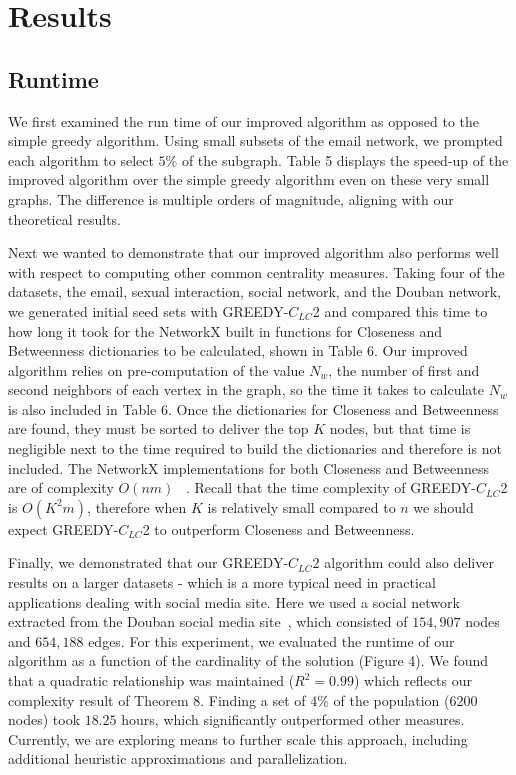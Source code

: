 \section*{Results}
\subsection*{Runtime}
We first examined the run time of our improved algorithm as opposed to the simple greedy algorithm.  Using small subsets of the email network, we prompted each algorithm to select $5\%$ of the subgraph. Table 5 displays the speed-up of the improved algorithm over the simple greedy algorithm even on these very small graphs.  The difference is multiple orders of magnitude, aligning with our theoretical results.

Next we wanted to demonstrate that our improved algorithm also performs well with respect to computing other common centrality measures.  Taking four of the datasets, the email, sexual interaction, social network, and the Douban network, we generated initial seed sets with GREEDY-$C_{LC}$2 and compared this time to how long it took for the NetworkX built in functions for Closeness and Betweenness dictionaries to be calculated, shown in Table 6.  Our improved algorithm relies on pre-computation of the value $N_w$, the number of first and second neighbors of each vertex in the graph, so the time it takes to calculate $N_w$ is also included in Table 6. Once the dictionaries for Closeness and Betweenness are found, they must be sorted to deliver the top $K$ nodes, but that time is negligible next to the time required to build the dictionaries and therefore is not included.  The NetworkX implementations for both Closeness and Betweenness are of complexity $O(n m)$ ~\cite{networkx,brandes}. Recall that the time complexity of GREEDY-$C_{LC}$2 is $O(K^2 m)$, therefore when $K$ is relatively small compared to $n$ we should expect GREEDY-$C_{LC}$2 to outperform Closeness and Betweenness.

Finally, we demonstrated that our GREEDY-$C_{LC}$2 algorithm could also deliver results on a larger datasets - which is a more typical need in practical applications dealing with social media site.  Here we used a social network extracted from the Douban social media site~\cite{douban}, which consisted of $154,907$ nodes and $654,188$ edges.  For this experiment, we evaluated the runtime of our algorithm as a function of the cardinality of the solution (Figure 4).  We found that a quadratic relationship was maintained ($R^2=0.99$) which reflects our complexity result of Theorem 8.  Finding a set of $4\%$ of the population ($6200$ nodes) took $18.25$ hours, which significantly outperformed other measures.  Currently, we are exploring means to further scale this approach, including additional heuristic approximations and parallelization.


